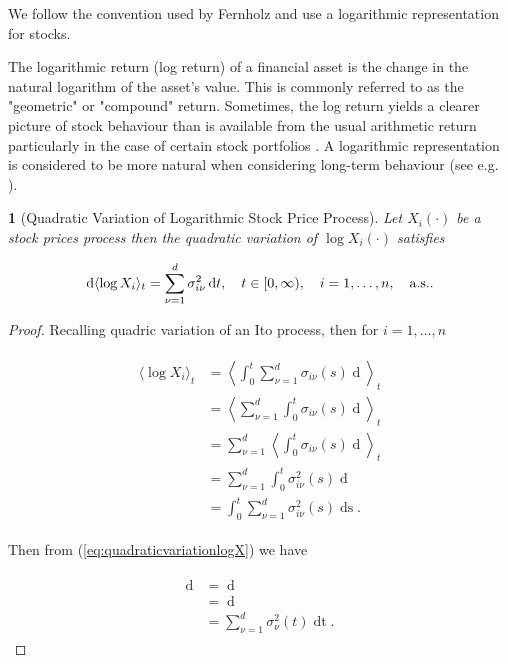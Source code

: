 \documentclass[british]{amsart} \usepackage{lmodern}
\numberwithin{equation}{section} \numberwithin{figure}{section}
\theoremstyle{plain} \newtheorem{thm}{\protect\theoremname}[section]
\theoremstyle{definition} \newtheorem{defn}[thm]{\protect\definitionname}
\theoremstyle{plain} \newtheorem{assumption}[thm]{\protect\assumptionname}
\theoremstyle{plain} \newtheorem{lem}[thm]{\protect\lemmaname}
\theoremstyle{plain} \newtheorem{prop}[thm]{\protect\propositionname}
\theoremstyle{remark} \newtheorem{rem}[thm]{\protect\remarkname}
\theoremstyle{plain} \newtheorem{cor}[thm]{\protect\corollaryname}
\renewcommand{\d}[1]{\mathop{\mathrm{d}{#1}}}
\newcommand{\rangei}{i=1,\dots,n} \newcommand{\measure}{\mathbb{P}}
\begin{document}
We follow the convention used by Fernholz and use a logarithmic representation
for stocks.

The logarithmic return (log return) of a financial asset is the change in the
natural logarithm of the asset's value. This is commonly referred to as the
"geometric" or "compound" return. Sometimes, the log return yields a clearer
picture of stock behaviour than is available from the usual arithmetic return
particularly in the case of certain stock portfolios
\cite{fernholz2007statistics}. A logarithmic representation is considered to be
more natural when considering long-term behaviour (see e.g.
\cite{fernholz1982}).

\begin{lem} [Quadratic Variation of Logarithmic Stock Price Process]

  Let $X_{i}(\cdot)$ be a stock prices process then the quadratic variation of
  $\log{X_{i}(\cdot)}$ satisfies

  \begin{equation} 
    \d{\langle \log{X_{i}} \rangle_{t}} = 
        \sum_{\nu=1}^{d} \sigma_{i\nu}^2\d{t}, 
    \quad \ranget, 
    \quad \rangei, 
    \quad \almostsurely.
  \end{equation} 

\end{lem}

\begin{proof} 

Recalling quadric variation of an Ito process, then for $\rangei$

  \begin{gather} 
    \begin{split} 
      \label{eq:quadraticvariationlogX} 
          \langle \log{X_{i}} \rangle_{t} 
& = \left< \int_{0}^{t} \sum_{\nu=1}^{d} \sigma_{i\nu}(s) \d{W_{\nu}(s)} \right>_{t} \\ 
& = \left< \sum_{\nu=1}^{d} \int_{0}^{t} \sigma_{i\nu}(s) \d{W_{\nu}(s)} \right>_{t} \\ 
& = \sum_{\nu=1}^{d} \left< \int_{0}^{t} \sigma_{i\nu}(s) \d{W_{\nu}(s)} \right>_{t} \\ 
& = \sum_{\nu=1}^{d} \int_{0}^{t} \sigma_{i\nu}^{2}(s) \d{\langle W_{\nu}(s) \rangle} \\
& = \int_{0}^{t} \sum_{\nu=1}^{d} \sigma_{i\nu}^{2}(s) \d{s}. 
    \end{split}
  \end{gather}
  
  Then from (\ref{eq:quadraticvariationlogX}) we have
  
  \begin{gather} 
    \begin{split} 
      \d{\langle \log{X} \rangle_{t}} 
& =\d{\left<\int_{0}^{t} \sum_{\nu=1}^{d} \sigma_{\nu}(s) \d{W_{\nu}(s)}\right>_{t}} \\ 
& = \d{\left(\int_{0}^{t} \sum_{\nu=1}^{d} \sigma_{\nu}^{2}(s) \d{s}\right)} \\ & = \sum_{\nu=1}^{d} \sigma_{\nu}^{2}(t)\d{t}.
    \end{split} 
  \end{gather}

\end{proof}
\end{document}
